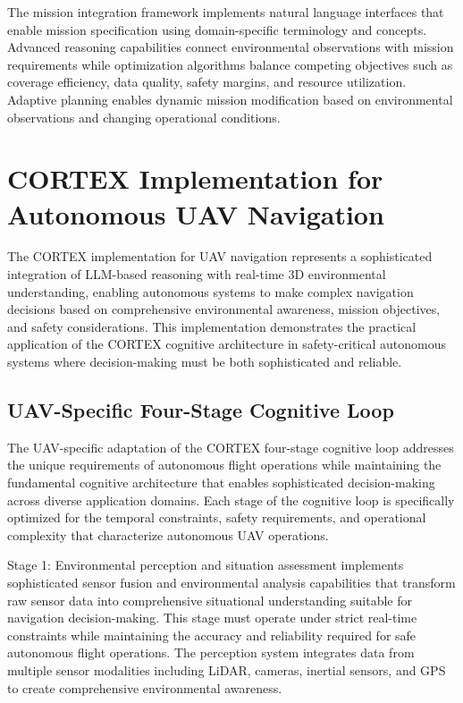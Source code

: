 The mission integration framework implements natural language interfaces that enable mission specification using domain-specific terminology and concepts. Advanced reasoning capabilities connect environmental observations with mission requirements while optimization algorithms balance competing objectives such as coverage efficiency, data quality, safety margins, and resource utilization. Adaptive planning enables dynamic mission modification based on environmental observations and changing operational conditions.

\section{CORTEX Implementation for Autonomous UAV Navigation}

The CORTEX implementation for UAV navigation represents a sophisticated integration of LLM-based reasoning with real-time 3D environmental understanding, enabling autonomous systems to make complex navigation decisions based on comprehensive environmental awareness, mission objectives, and safety considerations. This implementation demonstrates the practical application of the CORTEX cognitive architecture in safety-critical autonomous systems where decision-making must be both sophisticated and reliable.

\subsection{UAV-Specific Four-Stage Cognitive Loop}

The UAV-specific adaptation of the CORTEX four-stage cognitive loop addresses the unique requirements of autonomous flight operations while maintaining the fundamental cognitive architecture that enables sophisticated decision-making across diverse application domains. Each stage of the cognitive loop is specifically optimized for the temporal constraints, safety requirements, and operational complexity that characterize autonomous UAV operations.

Stage 1: Environmental perception and situation assessment implements sophisticated sensor fusion and environmental analysis capabilities that transform raw sensor data into comprehensive situational understanding suitable for navigation decision-making. This stage must operate under strict real-time constraints while maintaining the accuracy and reliability required for safe autonomous flight operations. The perception system integrates data from multiple sensor modalities including LiDAR, cameras, inertial sensors, and GPS to create comprehensive environmental awareness.

